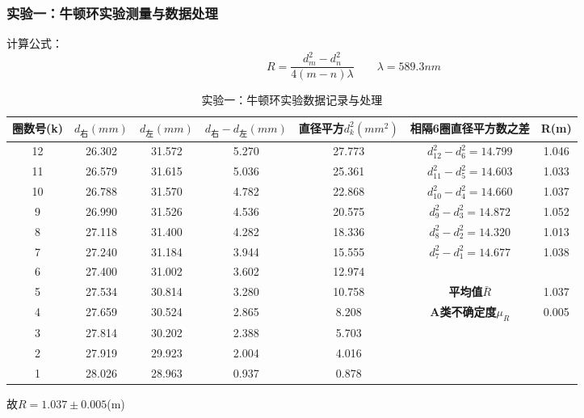 \documentclass[]{../../templates/Report}%
\begin{document}
\begin{fullreportonly}
\subsubsection{实验一：牛顿环实验测量与数据处理}
计算公式：
\[
R = \frac{d_m^2-d_n^2}{4(m-n)\lambda} \quad\quad  \lambda = 589.3nm
\]
\par
\begin{table}[H]
    \centering
    \caption{实验一：牛顿环实验数据记录与处理}
    \begin{tabular}{|c|c|c|c|c|c|c|}
        \hline
        \textbf{圈数号(k)} & \textbf{$d_\text{右}(mm)$} & \textbf{$d_\text{左}(mm)$} & \textbf{$d_\text{右}-d_\text{左} (mm)$} & \textbf{直径平方$d_k^2(mm^2)$} & \textbf{相隔6圈直径平方数之差} & \textbf{R(m)}  \\
        \hline
        12 & 26.302 & 31.572 & 5.270 & 27.773 & $d_{12}^2-d_6^2=14.799$ & 1.046  \\
        \hline
        11 & 26.579 & 31.615 & 5.036 & 25.361 & $d_{11}^2-d_5^2=14.603$ & 1.033  \\
        \hline
        10 & 26.788 & 31.570 & 4.782 & 22.868 & $d_{10}^2-d_4^2=14.660$ & 1.037  \\
        \hline
        9 & 26.990 & 31.526 & 4.536 & 20.575 & $d_9^2-d_3^2=14.872$ & 1.052  \\
        \hline
        8 & 27.118 & 31.400 & 4.282 & 18.336 & $d_8^2-d_2^2=14.320$ & 1.013  \\
        \hline
        7 & 27.240 & 31.184 & 3.944 & 15.555 & $d_7^2-d_1^2=14.677$ & 1.038  \\
        \hline
        6 & 27.400 & 31.002 & 3.602 & 12.974 & &  \\
        \hline
        5 & 27.534 & 30.814 & 3.280 & 10.758 & \textbf{平均值$\bar{R}$} & 1.037 \\
        \hline
        4 & 27.659 & 30.524 & 2.865 & 8.208 & \textbf{A类不确定度$\mu_R$} & 0.005 \\
        \hline
        3 & 27.814 & 30.202 & 2.388 & 5.703 & &  \\
        \hline
        2 & 27.919 & 29.923 & 2.004 & 4.016 & &  \\
        \hline
        1 & 28.026 & 28.963 & 0.937 & 0.878 & &  \\
        \hline
    \end{tabular}
\end{table}
故$R = 1.037 \pm 0.005$(m)


\end{fullreportonly}
\end{document}
